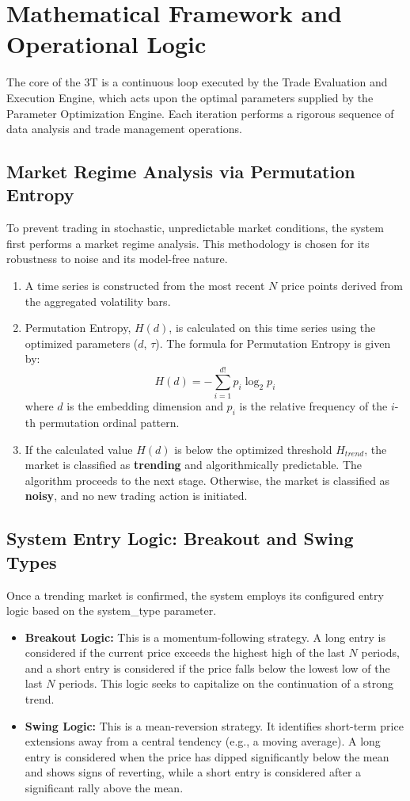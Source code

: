 \documentclass[11pt]{article}
\begin{document}
\section{Mathematical Framework and Operational Logic}
The core of the 3T is a continuous loop executed by the Trade Evaluation and Execution Engine, which acts upon the optimal parameters supplied by the Parameter Optimization Engine. Each iteration performs a rigorous sequence of data analysis and trade management operations.

\subsection{Market Regime Analysis via Permutation Entropy}
To prevent trading in stochastic, unpredictable market conditions, the system first performs a market regime analysis. This methodology is chosen for its robustness to noise and its model-free nature.\cite{PhysRevLett.88.174102}
\begin{enumerate}
    \item A time series is constructed from the most recent $N$ price points derived from the aggregated volatility bars.
    \item Permutation Entropy, $H(d)$, is calculated on this time series using the optimized parameters ($d$, $\tau$). The formula for Permutation Entropy is given by:
    $$ H(d) = -\sum_{i=1}^{d!} p_i \log_2 p_i $$
    where $d$ is the embedding dimension and $p_i$ is the relative frequency of the $i$-th permutation ordinal pattern.
    \item If the calculated value $H(d)$ is below the optimized threshold $H_{trend}$, the market is classified as \textbf{trending} and algorithmically predictable. The algorithm proceeds to the next stage. Otherwise, the market is classified as \textbf{noisy}, and no new trading action is initiated.
\end{enumerate}

\subsection{System Entry Logic: Breakout and Swing Types}
Once a trending market is confirmed, the system employs its configured entry logic based on the system\_type parameter.
\begin{itemize}
    \item \textbf{Breakout Logic:} This is a momentum-following strategy. A long entry is considered if the current price exceeds the highest high of the last $N$ periods, and a short entry is considered if the price falls below the lowest low of the last $N$ periods. This logic seeks to capitalize on the continuation of a strong trend.
    \item \textbf{Swing Logic:} This is a mean-reversion strategy. It identifies short-term price extensions away from a central tendency (e.g., a moving average). A long entry is considered when the price has dipped significantly below the mean and shows signs of reverting, while a short entry is considered after a significant rally above the mean.
\end{itemize}
\end{document}
